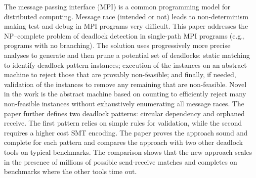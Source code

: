 The message passing interface (MPI) is a common programming model for distributed computing. Message race (intended or not) leads to non-determinism making test and debug in MPI programs very difficult. This paper addresses the NP--complete problem of deadlock detection in single-path MPI programs (e.g., programs with no branching). The solution uses progressively more precise analyses to generate and then prune a potential set of deadlocks: static matching to identify deadlock pattern instances; execution of the instances on an abstract machine to reject those that are provably non-feasible; and finally, if needed, validation of the instances to remove any remaining that are non-feasible. Novel in the work is the abstract machine based on counting to efficiently reject many non-feasible instances without exhaustively enumerating all message races.  The paper further defines two deadlock patterns: circular dependency and orphaned receive. The first pattern relies on simple rules for validation, while the second requires a higher cost SMT encoding. The paper proves the approach sound and complete for each pattern and compares the approach with two other deadlock tools on typical benchmarks. The comparison shows that the new approach scales in the presence of millions of possible send-receive matches and completes on benchmarks where the other tools time out.
